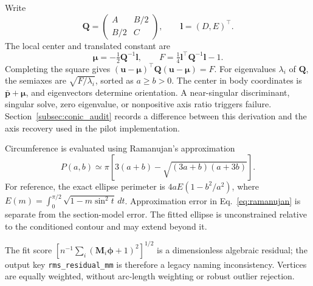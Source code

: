 \documentclass[11pt,a4paper]{article}
\numberwithin{equation}{section}
\begin{document}
Write
\begin{equation}
\mathbf Q=\begin{pmatrix}A&B/2\\B/2&C\end{pmatrix},\qquad
\mathbf l=(D,E)^\top.
\end{equation}
The local center and translated constant are
\begin{equation}
\boldsymbol\mu=-\tfrac12\mathbf Q^{-1}\mathbf l,\qquad
F=\tfrac14\mathbf l^\top\mathbf Q^{-1}\mathbf l-1.
\end{equation}
Completing the square gives $(\mathbf u-\boldsymbol\mu)^\top\mathbf Q(\mathbf u-\boldsymbol\mu)=F$. For eigenvalues $\lambda_i$ of $\mathbf Q$, the semiaxes are $\sqrt{F/\lambda_i}$, sorted as $a\ge b>0$. The center in body coordinates is $\bar{\mathbf p}+\boldsymbol\mu$, and eigenvectors determine orientation. A near-singular discriminant, singular solve, zero eigenvalue, or nonpositive axis ratio triggers failure. Section~\ref{subsec:conic_audit} records a difference between this derivation and the axis recovery used in the pilot implementation.

Circumference is evaluated using Ramanujan's approximation~\cite{ramanujan1914modular}
\begin{equation}
P(a,b)\simeq\pi\left[3(a+b)-\sqrt{(3a+b)(a+3b)}\right].
\label{eq:ramanujan}
\end{equation}
For reference, the exact ellipse perimeter is $4aE(1-b^2/a^2)$, where $E(m)=\int_0^{\pi/2}\sqrt{1-m\sin^2t}\,dt$. Approximation error in Eq.~\eqref{eq:ramanujan} is separate from the section-model error. The fitted ellipse is unconstrained relative to the conditioned contour and may extend beyond it.

The fit score $[n^{-1}\sum_i(\mathbf M_i\boldsymbol\phi+1)^2]^{1/2}$ is a dimensionless algebraic residual; the output key \texttt{rms\_residual\_mm} is therefore a legacy naming inconsistency. Vertices are equally weighted, without arc-length weighting or robust outlier rejection.
\end{document}
